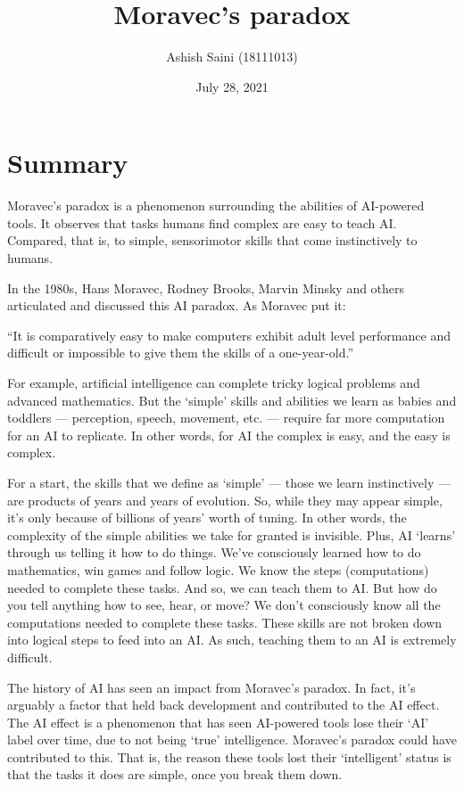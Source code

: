 \documentclass[12pt]{article}
\begin{document}
\title{Moravec's paradox}
\author{Ashish Saini (18111013)}
\date{July 28, 2021}
\maketitle



\section{Summary}

Moravec’s paradox is a phenomenon surrounding the abilities of AI-powered tools. It observes that tasks humans find complex are easy to teach AI. Compared, that is, to simple, sensorimotor skills that come instinctively to humans.  \par

In the 1980s, Hans Moravec, Rodney Brooks, Marvin Minsky and others articulated and discussed this AI paradox. As Moravec put it:

 \begin{center}
“It is comparatively easy to make computers exhibit adult level performance and difficult or impossible to give them the skills of a one-year-old.”
 \end{center}

For example, artificial intelligence can complete tricky logical problems and advanced mathematics. But the ‘simple’ skills and abilities we learn as babies and toddlers — perception, speech, movement, etc. — require far more computation for an AI to replicate. In other words, for AI the complex is easy, and the easy is complex.   \par

For a start, the skills that we define as ‘simple’ — those we learn instinctively — are products of years and years of evolution. So, while they may appear simple, it’s only because of billions of years’ worth of tuning. In other words, the complexity of the simple abilities we take for granted is invisible. Plus, AI ‘learns’ through us telling it how to do things. We’ve consciously learned how to do mathematics, win games and follow logic. We know the steps (computations) needed to complete these tasks. And so, we can teach them to AI. But how do you tell anything how to see, hear, or move? We don’t consciously know all the computations needed to complete these tasks. These skills are not broken down into logical steps to feed into an AI. As such, teaching them to an AI is extremely difficult.    \par

The history of AI has seen an impact from Moravec’s paradox. In fact, it’s arguably a factor that held back development and contributed to the AI effect. The AI effect is a phenomenon that has seen AI-powered tools lose their ‘AI’ label over time, due to not being ‘true’ intelligence. Moravec’s paradox could have contributed to this. That is, the reason these tools lost their ‘intelligent’ status is that the tasks it does are simple, once you break them down.
\end{document}
